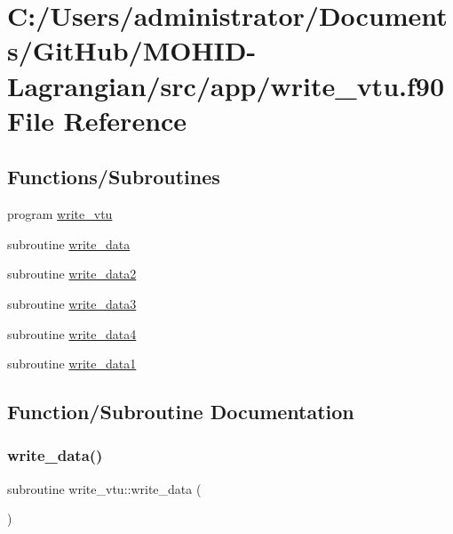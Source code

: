 \hypertarget{write__vtu_8f90}{}\section{C\+:/\+Users/administrator/\+Documents/\+Git\+Hub/\+M\+O\+H\+I\+D-\/\+Lagrangian/src/app/write\+\_\+vtu.f90 File Reference}
\label{write__vtu_8f90}
\subsection*{Functions/\+Subroutines}
\begin{DoxyCompactItemize}
\item 
program \mbox{\hyperlink{write__vtu_8f90_a8bbc7ab4725ee50b236ba1ffab6f3b88}{write\+\_\+vtu}}
\item 
subroutine \mbox{\hyperlink{write__vtu_8f90_ad3d26430620662abc6caea56402b8c72}{write\+\_\+data}}
\item 
subroutine \mbox{\hyperlink{write__vtu_8f90_ad806107886f0521aac56740b4a2aaf62}{write\+\_\+data2}}
\item 
subroutine \mbox{\hyperlink{write__vtu_8f90_ab859d2be74950aa978bc251eddf0b307}{write\+\_\+data3}}
\item 
subroutine \mbox{\hyperlink{write__vtu_8f90_a2a0b4e97269ec439c6dd440509f9742c}{write\+\_\+data4}}
\item 
subroutine \mbox{\hyperlink{write__vtu_8f90_ae39ce165900c97fc318d09bf9670ac92}{write\+\_\+data1}}
\end{DoxyCompactItemize}


\subsection{Function/\+Subroutine Documentation}
\mbox{\label{write__vtu_8f90_ad3d26430620662abc6caea56402b8c72}} 
\subsubsection{\texorpdfstring{write\+\_\+data()}{write\_data()}}
{\footnotesize\ttfamily subroutine write\+\_\+vtu\+::write\+\_\+data (\begin{DoxyParamCaption}{ }\end{DoxyParamCaption})}




